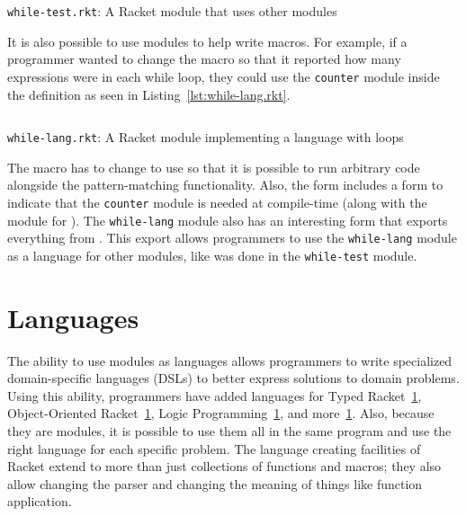 \begin{listing}
  \inputminted{racket}{listings/while-test.rkt}
  \caption{\texttt{while-test.rkt}: A Racket module that uses other modules}
  \label{lst:while-test.rkt}
\end{listing}

It is also possible to use modules to help write macros.
For example, if a programmer wanted to change the  macro so that it reported how many expressions were in each while loop, they could use the \texttt{counter} module inside the  definition as seen in Listing~\ref{lst:while-lang.rkt}.
\begin{listing}
  \inputminted{racket}{listings/while-lang.rkt}
  \caption{\texttt{while-lang.rkt}: A Racket module implementing a language with  loops}
  \label{lst:while-lang.rkt}
\end{listing}
The  macro has to change to use  so that it is possible to run arbitrary code alongside the pattern-matching functionality.
Also, the  form includes a  form to indicate that the \texttt{counter} module is needed at compile-time (along with the  module for ).
The \texttt{while-lang} module also has an interesting  form that exports everything from .
This export allows programmers to use the \texttt{while-lang} module as a language for other modules, like was done in the \texttt{while-test} module.

\section{Languages}
The ability to use modules as languages allows programmers to write specialized domain-specific languages (DSLs) to better express solutions to domain problems. 
Using this ability, programmers have added languages for Typed Racket~\ref{}, Object-Oriented Racket~\ref{}, Logic Programming~\ref{}, and more~\ref{}.
Also, because they are modules, it is possible to use them all in the same program and use the right language for each specific problem.
The language creating facilities of Racket extend to more than just collections of functions and macros; they also allow changing the parser and changing the meaning of things like function application. 

